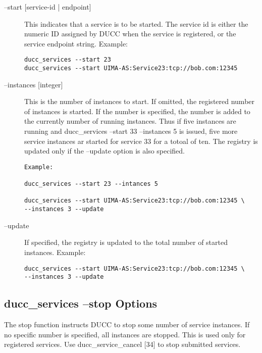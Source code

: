        \begin{description}
       \item[--start {[service-id | endpoint]}] This indicates that a service is to be started. The service id
         is either the numeric ID assigned by DUCC when the service is registered, or the service
         endpoint string.  Example:
\begin{verbatim}
ducc_services --start 23 
ducc_services --start UIMA-AS:Service23:tcp://bob.com:12345 
\end{verbatim}
         
       \item[--instances {[integer]}] This is the number of instances to start. If omitted, the
         registered number of instances is started. If the number is specified, the number is added
         to the currently number of running instances. Thus if five instances are running and
         ducc\_services --start 33 --instances 5 is issued, five more service instances ar started
         for service 33 for a totoal of ten. The registry is updated only if the --update option is
         also specified.
\begin{verbatim}
Example: 

ducc_services --start 23 --intances 5 

ducc_services --start UIMA-AS:Service23:tcp://bob.com:12345 \ 
--instances 3 --update 
\end{verbatim}
       \item[--update]If specified, the registry is updated to the total number of started
         instances.  Example:
\begin{verbatim}
ducc_services --start UIMA-AS:Service23:tcp://bob.com:12345 \ 
--instances 3 --update 
\end{verbatim}
       \end{description}

    \subsection{ducc\_services --stop Options}
    The stop function instructs DUCC to stop some number of service instances. If no specific number
    is specified, all instances are stopped. This is used only for registered services. Use
    ducc\_service\_cancel [34] to stop submitted services.

